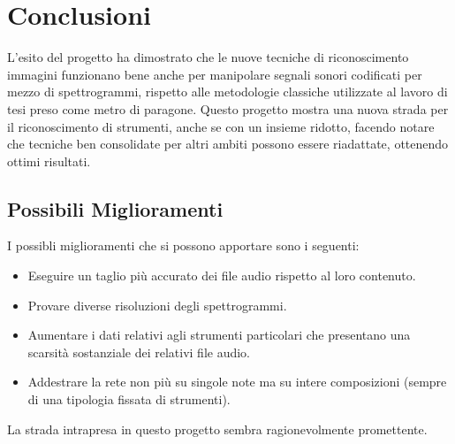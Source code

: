 \documentclass{article}
\begin{document}
\section{Conclusioni}
L'esito del progetto ha dimostrato che le nuove tecniche di riconoscimento immagini funzionano bene anche per manipolare 
segnali sonori codificati per mezzo di spettrogrammi, rispetto alle metodologie classiche
utilizzate al lavoro di tesi preso come metro di paragone. Questo progetto mostra una nuova strada per il riconoscimento
di strumenti, anche se con un insieme ridotto, facendo notare che tecniche ben consolidate per altri ambiti possono essere 
riadattate, ottenendo ottimi risultati.

\subsection{Possibili Miglioramenti}
I possibli miglioramenti che si possono apportare sono i seguenti:
\begin{itemize}
    \item Eseguire un taglio più accurato dei file audio rispetto al loro contenuto.
    \item Provare diverse risoluzioni degli spettrogrammi.
    \item Aumentare i dati relativi agli strumenti particolari che presentano una scarsità sostanziale dei relativi file audio.
    \item Addestrare la rete non più su singole note ma su intere composizioni (sempre di una tipologia fissata di strumenti).
\end{itemize}
La strada intrapresa in questo progetto sembra ragionevolmente promettente.   
    


        
\end{document}

